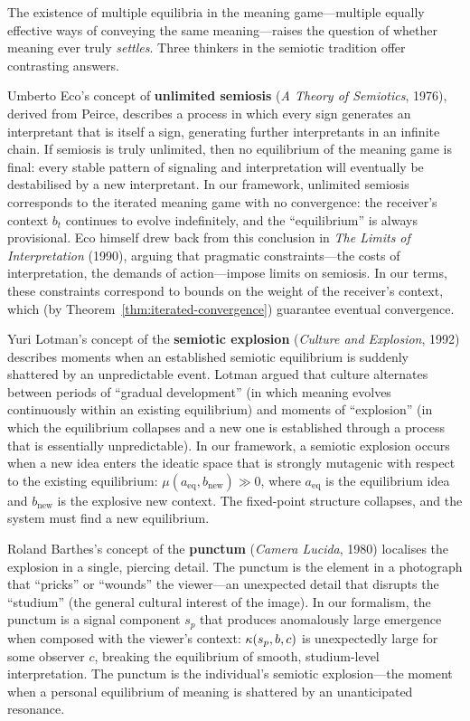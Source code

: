 \begin{interpretation}
\label{interp:ch14:eco_lotman_barthes}
The existence of multiple equilibria in the meaning game---multiple equally
effective ways of conveying the same meaning---raises the question of whether
meaning ever truly \emph{settles}.  Three thinkers in the semiotic tradition
offer contrasting answers.

Umberto Eco's concept of \textbf{unlimited semiosis} (\emph{A Theory of
Semiotics}, 1976), derived from Peirce, describes a process in which every
sign generates an interpretant that is itself a sign, generating further
interpretants in an infinite chain.  If semiosis is truly unlimited, then no
equilibrium of the meaning game is final: every stable pattern of
signaling and interpretation will eventually be destabilised by a new
interpretant.  In our framework, unlimited semiosis corresponds to the
iterated meaning game with no convergence: the receiver's context $b_t$
continues to evolve indefinitely, and the ``equilibrium'' is always
provisional.  Eco himself drew back from this conclusion in \emph{The Limits
of Interpretation} (1990), arguing that pragmatic constraints---the costs of
interpretation, the demands of action---impose limits on semiosis.  In our
terms, these constraints correspond to bounds on the weight of the
receiver's context, which (by Theorem~\ref{thm:iterated-convergence})
guarantee eventual convergence.

Yuri Lotman's concept of the \textbf{semiotic explosion} (\emph{Culture and
Explosion}, 1992) describes moments when an established semiotic equilibrium
is suddenly shattered by an unpredictable event.  Lotman argued that culture
alternates between periods of ``gradual development'' (in which meaning
evolves continuously within an existing equilibrium) and moments of
``explosion'' (in which the equilibrium collapses and a new one is
established through a process that is essentially unpredictable).  In our
framework, a semiotic explosion occurs when a new idea enters the ideatic
space that is strongly mutagenic with respect to the existing equilibrium:
$\mu(a_{\mathrm{eq}}, b_{\mathrm{new}}) \gg 0$, where $a_{\mathrm{eq}}$ is
the equilibrium idea and $b_{\mathrm{new}}$ is the explosive new context.
The fixed-point structure collapses, and the system must find a new
equilibrium.

Roland Barthes's concept of the \textbf{punctum} (\emph{Camera Lucida},
1980) localises the explosion in a single, piercing detail.  The punctum is
the element in a photograph that ``pricks'' or ``wounds'' the viewer---an
unexpected detail that disrupts the ``studium'' (the general cultural
interest of the image).  In our formalism, the punctum is a signal component
$s_p$ that produces anomalously large emergence when composed with the
viewer's context: $\kappa(s_p, b, c)$ is unexpectedly large for some
observer $c$, breaking the equilibrium of smooth, studium-level
interpretation.  The punctum is the individual's semiotic explosion---the
moment when a personal equilibrium of meaning is shattered by an
unanticipated resonance.
\end{interpretation}



